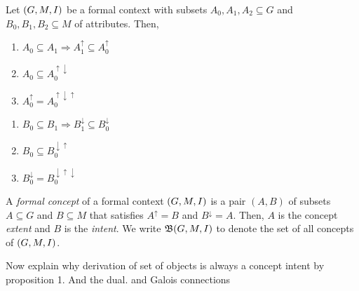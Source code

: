 \begin{proposition}
  \label{proposition:properties-about-derivation-operators}
  Let $(G,M,I)$ be a formal context with subsets $A_0, A_1, A_2 \subseteq G$ and $B_0, B_1, B_2 \subseteq M$ of attributes. Then,
  \begin{center}
    \begin{minipage}[t]{0.48\textwidth}
      \begin{enumerate}
        \item $A_0 \subseteq A_1 \Rightarrow A_1^\uparrow \subseteq A_0^\uparrow$
        \item $A_0 \subseteq A_0^{\uparrow \downarrow}$
        \item $A_0^\uparrow = A_0^{\uparrow \downarrow \uparrow}$
      \end{enumerate}
    \end{minipage}%
    \hfill
    \begin{minipage}[t]{0.48\textwidth}
      \begin{enumerate}
        \item $B_0 \subseteq B_1 \Rightarrow B_1^\downarrow \subseteq B_0^\downarrow$
        \item $B_0 \subseteq B_0^{\downarrow \uparrow}$
        \item $B_0^\downarrow = B_0^{\downarrow \uparrow \downarrow}$
      \end{enumerate}
    \end{minipage}
  \end{center}
\end{proposition}

\begin{definition}
  \label{definition:formal-concept}
  A \textit{formal concept} of a formal context $(G,M,I)$ is a pair $(A,B)$ of subsets $A \subseteq G$ and $B \subseteq M$ that satisfies $A^\uparrow = B$ and $B^\downarrow = A$. Then, $A$ is the concept \textit{extent} and $B$ is the \textit{intent}. We write $\mathfrak{B}(G,M,I)$ to denote the set of all concepts of $(G,M,I)$.
\end{definition}

Now explain why derivation of set of objects is always a concept intent by proposition 1. And the dual. and Galois connections

